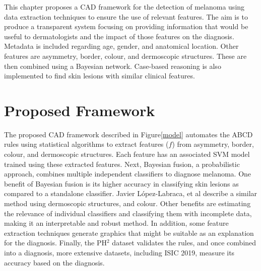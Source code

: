 This chapter proposes a CAD framework for the detection of melanoma using data extraction techniques to ensure the use of relevant features. The aim is to produce a transparent system focusing on providing information that would be useful to dermatologists and the impact of those features on the diagnosis. Metadata is included regarding age, gender, and anatomical location. Other features are asymmetry, border, colour, and dermoscopic structures. These are then combined using a Bayesian network. Case-based reasoning is also implemented to find skin lesions with similar clinical features.

\section{Proposed Framework}
The proposed CAD framework described in Figure\ref{model} automates the ABCD rules using statistical algorithms to extract features ($f$) from asymmetry, border, colour, and dermoscopic structures. Each feature has an associated SVM model trained using these extracted features. Next, Bayesian fusion, a probabilistic approach, combines multiple independent classifiers to diagnose melanoma. One benefit of Bayesian fusion is its higher accuracy in classifying skin lesions as compared to a standalone classifier\cite{Takruri2017}.  Javier López-Labraca, et al describe a similar method using dermoscopic structures, and colour\cite{Lopez-Labraca2018}. Other benefits are estimating the relevance of individual classifiers and classifying them with incomplete data, making it an interpretable and robust method. In addition, some feature extraction techniques generate graphics that might be suitable as an explanation for the diagnosis. Finally, the PH$^2$ dataset validates the rules, and once combined into a diagnosis, more extensive datasets, including ISIC 2019, measure its accuracy based on the diagnosis.

